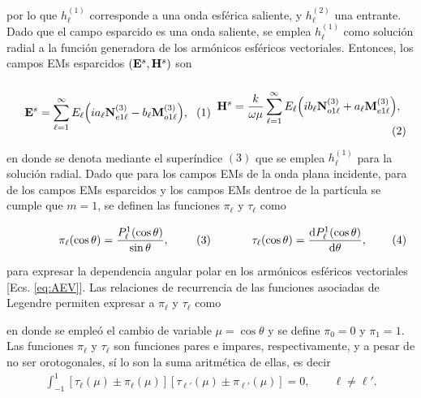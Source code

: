 
\vspace*{-1em}\noindent
por lo que $h_\ell^{(1)}$ corresponde a una onda esférica saliente, y $h_\ell^{(2)}$ una entrante. Dado que el campo esparcido es una onda saliente, se emplea $h_\ell^{(1)}$ como solución radial a la función generadora de los armónicos esféricos vectoriales. Entonces, los campos EMs esparcidos $(\vb{E}^s,\vb{H}^s)$ son 
	\begin{subequations}
	\eqhalf{\vb{E}^s = \sum_{\ell =1}^\infty E_\ell \qty(i a_\ell \vb{N}_{e1\ell}^{(3)}- b_\ell\vb{M}_{o1\ell}^{(3)}),
		\label{eqs:EsAEV}}
	\eqhalf{\vb{H}^s = \frac{k}{\omega\mu} \sum_{\ell =1}^\infty E_\ell\qty(ib_\ell\vb{N}_{o1\ell}^{(3)}+a_\ell\vb{M}_{e1\ell}^{(3)}),
		\label{eqs:HsAEV}}	
	\label{eq:EHsAEV}		
	\end{subequations}
		
\noindent
en donde se denota mediante el superíndice $(3)$ que se emplea $h_\ell^{(1)}$ para la solución radial. Dado que para los campos EMs de la onda plana incidente, para de los campos EMs esparcidos y los campos EMs dentroe de la partícula se cumple que $m= 1$, se definen las funciones   $\pi_\ell$ y $\tau_\ell$ como  

	\begin{subequations}
	\eqhalf{\pi_\ell(\cos\theta)= \frac{P_\ell^1(\cos\theta)}{\sin\theta},
		\label{eqs:pi}}
	\eqhalf{\tau_\ell(\cos\theta) = \dv{P_\ell^1(\cos\theta)}{\theta},
		\label{eqs:tau}}	
	\label{eq:pitau}		
	\end{subequations}

\noindent
para expresar la dependencia angular polar en los armónicos esféricos vectoriales [Ecs. \eqref{eq:AEV}]. Las relaciones de recurrencia de las funciones asociadas de Legendre \cite{arfken2001methods} permiten expresar a  $\pi_\ell$ y $\tau_\ell$ como  \cite{bohren1998absorption}


\noindent
en donde se empleó el cambio de variable $\mu = \cos\theta$ y se define   $\pi_0 =0 $ y $\pi_1 = 1$.  Las funciones $\pi_\ell$ y $\tau_\ell$ son funciones pares e impares, respectivamente, y a pesar de no ser orotogonales, sí lo son la suma aritmética de ellas, es decir
	\begin{align}
	\int_{-1}^{1}[\tau_\ell(\mu)\pm\pi_\ell(\mu)]
	[\tau_{\ell'}(\mu)\pm\pi_{\ell'}(\mu)] = 0, \qquad \ell\neq \ell'. 
	\label{eq:ortTauPi}
	\end{align}

